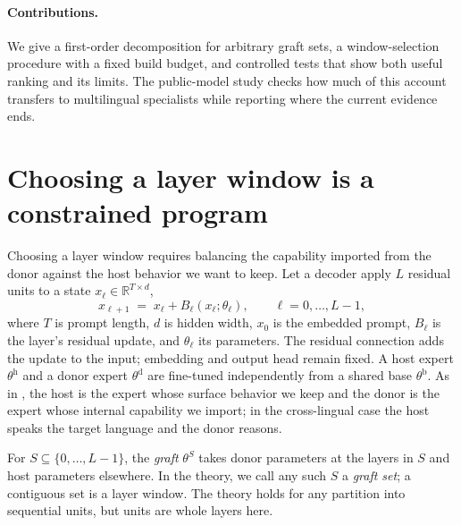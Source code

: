\documentclass{article}
\theoremstyle{plain}
\theoremstyle{definition}
\theoremstyle{remark}
\newcommand{\host}{\mathrm{h}}
\newcommand{\donor}{\mathrm{d}}
\newcommand{\base}{\mathrm{b}}
\newcommand{\Rb}{\mathbb{R}}
\begin{document}
\paragraph{Contributions.}
We give a first-order decomposition for arbitrary graft sets, a window-selection
procedure with a fixed build budget, and controlled tests that show both useful
ranking and its limits. The public-model study checks how much of this account
transfers to multilingual specialists while reporting where the current
evidence ends.

\section{Choosing a layer window is a constrained program}
\label{sec:setup}

Choosing a layer window requires balancing the capability imported from the
donor against the host behavior we want to keep. Let a decoder apply
$L$ residual units to a state $x_\ell \in \Rb^{T\times d}$,
\begin{equation}
x_{\ell+1} \;=\; x_\ell + B_\ell(x_\ell;\theta_\ell), \qquad \ell = 0,\dots,L-1,
\end{equation}
where $T$ is prompt length, $d$ is hidden width, $x_0$ is the embedded prompt,
$B_\ell$ is the layer's residual update, and $\theta_\ell$ its parameters.
The residual connection adds the update to the input; embedding and output
head remain fixed. A host expert $\theta^{\host}$ and a donor
expert $\theta^{\donor}$ are fine-tuned independently from a shared base
$\theta^{\base}$. As in \citet{bandarkar2025layerswap}, the host is the expert
whose surface behavior we keep and the donor is the expert whose internal
capability we import; in the cross-lingual case the host speaks the target
language and the donor reasons.

For $S\subseteq\{0,\dots,L-1\}$, the \emph{graft} $\theta^{S}$ takes donor
parameters at the layers in $S$ and host parameters elsewhere. In the theory,
we call any such $S$ a \emph{graft set}; a contiguous set is a layer window.
The theory holds for any partition into sequential units, but units are whole
layers here.
\end{document}
